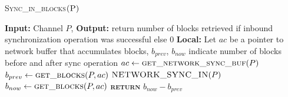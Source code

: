 \documentclass[10pt]{article}
\begin{document}



\begin{algorithm}{}
\footnotesize
\caption{\textsc{Sync\_in\_blocks}{$\textsc{(P})$}}
\label{alg:Sync_in_blocks} 
\begin{algorithmic}[1]

\STATE \textbf{Input:} Channel $P$,
\STATE \textbf{Output:} return number of blocks retrieved if inbound synchronization operation was successful else {$0$}
\STATE \textbf{Local:} Let $ac$ be a pointer to network buffer that accumulates blocks, $b_{prev}$, $b_{now}$ indicate number of blocks before and after sync operation
\STATE \quad $\textbf{$ac$} \leftarrow  \textsc{get\_network\_sync\_buf}(P)$ 
\STATE \quad $\textbf{$b_{prev}$} \leftarrow  \textsc{get\_blocks}(P, ac)$ 
\STATE \quad $\textsc{NETWORK\_SYNC\_IN}(P)$ 
\STATE \quad $\textbf{$b_{now}$} \leftarrow  \textsc{get\_blocks}(P, ac)$ 
\STATE \textsc{\textbf{return}} {$b_{now} - b_{prev}$}
\STATE


\end{algorithmic}
\end{algorithm}


\end{document}
